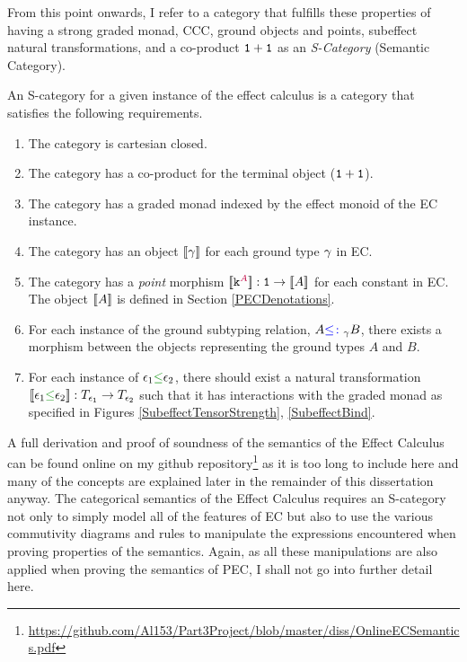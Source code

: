\documentclass{Report}
\begin{document}
From this point onwards, I refer to a category that fulfills these properties of having a strong graded monad, CCC, ground objects and points, subeffect natural transformations, and a co-product $\texttt{1} + \texttt{1}$ as an \textit{S-Category} (Semantic Category).

\begin{framed}
    \begin{definition}\label{SCategoryDefinition}   
        An S-category for a given instance of the effect calculus is a category that satisfies the following requirements.
        \begin{enumerate}[label=\roman*.]
            \item The category is cartesian closed.
            \item The category has a co-product for the terminal object ($\texttt{1} + \texttt{1}$).
            \item The category has a graded monad indexed by the effect monoid of the EC instance.
            \item The category has an object ${\bf [\![}\gamma{\bf ]\!]}$ for each ground type $\gamma$ in EC.
            \item The category has a \textit{point} morphism ${\bf [\![}\texttt{k}^{\color{purple} A}{\bf ]\!]}: \texttt{1}\rightarrow {\bf [\![}A{\bf ]\!]}$ for each constant in EC. The object ${\bf [\![}A{\bf ]\!]}$ is defined in Section \ref{PECDenotations}.
            \item For each instance of the ground subtyping relation, $A {\color{blue} \leq\colon}_\gamma B$, there exists a morphism between the objects representing the ground types $A$ and $B$.
            \item For each instance of $\e_1 \subeffect \e_2$, there should exist a natural transformation $\db{\e_1\subeffect\e_2}: \T{\e_1}{}\rightarrow\T{\e_2}{}$ such that it has interactions with the graded monad as specified in Figures \ref{SubeffectTensorStrength}, \ref{SubeffectBind}.
        \end{enumerate}
    \end{definition}
\end{framed}

A full derivation and proof of soundness of the semantics of the Effect Calculus can be found online on my github repository\footnote{\url{https://github.com/Al153/Part3Project/blob/master/diss/OnlineECSemantics.pdf}} as it is too long to include here and many of the concepts are explained later in the remainder of this dissertation anyway. The categorical semantics of the Effect Calculus requires an S-category not only to simply model all of the features of EC but also to use the various commutivity diagrams and rules to manipulate the expressions encountered when proving properties of the semantics. Again, as all these manipulations are also applied when proving the semantics of PEC, I shall not go into further detail here.
\end{document}

